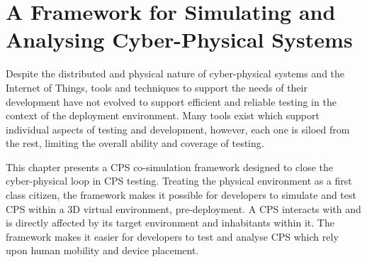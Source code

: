 \chapter{A Framework for Simulating and Analysing Cyber-Physical Systems}
\label{chap:framework}






Despite the distributed and physical nature of cyber-physical systems and the Internet of Things, tools and techniques to support the needs of their development have not evolved to support efficient and reliable testing in the context of the deployment environment. Many tools exist which support individual aspects of testing and development, however, each one is siloed from the rest, limiting the overall ability and coverage of testing.

This chapter presents a CPS co-simulation framework designed to close the cyber-physical loop in CPS testing. Treating the physical environment as a first class citizen, the framework makes it possible for developers to simulate and test CPS within a 3D virtual environment, pre-deployment. A CPS interacts with and is directly affected by its target environment and inhabitants within it. The framework makes it easier for developers to test and analyse CPS which rely upon human mobility and device placement.

